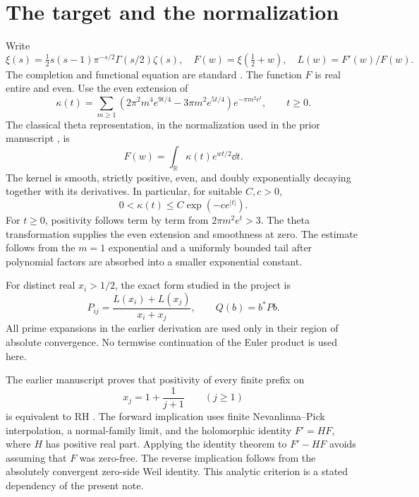 \documentclass[11pt,letterpaper]{article}
\theoremstyle{remark}\newtheorem{remark}[theorem]{Remark}
\newcommand{\R}{\mathbb R}\newcommand{\C}{\mathbb C}
\numberwithin{equation}{section}
\begin{document}
\section{The target and the normalization}

Write
\begin{equation}
\xi(s)=\tfrac12s(s-1)\pi^{-s/2}\Gamma(s/2)\zeta(s),\quad
F(w)=\xi(\tfrac12+w),\quad L(w)=F'(w)/F(w).
\end{equation}
The completion and functional equation are standard \cite{dlmf-xi}. The function $F$ is real entire and even. Use the even extension of
\begin{equation}\label{eq:kappa}
\kappa(t)=\sum_{m\ge1}\left(2\pi^2m^4e^{9t/4}-3\pi m^2e^{5t/4}\right)e^{-\pi m^2e^t},\qquad t\ge0.
\end{equation}
The classical theta representation, in the normalization used in the prior manuscript \cite{project}, is
\begin{equation}\label{eq:F}
F(w)=\int_{\R}\kappa(t)e^{wt/2}\dd t.
\end{equation}
The kernel is smooth, strictly positive, even, and doubly exponentially decaying together with its derivatives. In particular, for suitable $C,c>0$,
\begin{equation}\label{eq:decay}
0<\kappa(t)\le C\exp(-c e^{|t|}).
\end{equation}
For $t\ge0$, positivity follows term by term from $2\pi m^2e^t>3$. The theta transformation supplies the even extension and smoothness at zero. The estimate follows from the $m=1$ exponential and a uniformly bounded tail after polynomial factors are absorbed into a smaller exponential constant.

For distinct real $x_i>1/2$, the exact form studied in the project is
\begin{equation}\label{eq:P}
P_{ij}=\frac{L(x_i)+L(x_j)}{x_i+x_j},\qquad Q(b)=b^*Pb.
\end{equation}
All prime expansions in the earlier derivation are used only in their region of absolute convergence. No termwise continuation of the Euler product is used here.

The earlier manuscript proves that positivity of every finite prefix on
\begin{equation}\label{eq:sparse}
x_j=1+\frac1{j+1}\qquad(j\ge1)
\end{equation}
is equivalent to RH \cite[Section 4]{project}. The forward implication uses finite Nevanlinna--Pick interpolation, a normal-family limit, and the holomorphic identity $F'=HF$, where $H$ has positive real part. Applying the identity theorem to $F'-HF$ avoids assuming that $F$ was zero-free. The reverse implication follows from the absolutely convergent zero-side Weil identity. This analytic criterion is a stated dependency of the present note.
\end{document}
